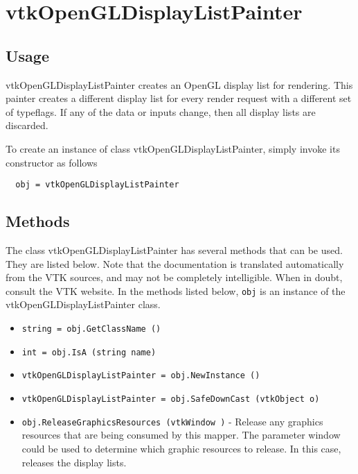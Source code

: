 \section{vtkOpenGLDisplayListPainter}

\subsection{Usage}

 vtkOpenGLDisplayListPainter creates an OpenGL display list for rendering.
 This painter creates a different display list for every render request with a
 different set of typeflags. If any of the data or inputs change, then all
 display lists are discarded.

To create an instance of class vtkOpenGLDisplayListPainter, simply
invoke its constructor as follows
\begin{verbatim}
  obj = vtkOpenGLDisplayListPainter
\end{verbatim}
\subsection{Methods}

The class vtkOpenGLDisplayListPainter has several methods that can be used.
  They are listed below.
Note that the documentation is translated automatically from the VTK sources,
and may not be completely intelligible.  When in doubt, consult the VTK website.
In the methods listed below, \verb|obj| is an instance of the vtkOpenGLDisplayListPainter class.
\begin{itemize}
\item  \verb|string = obj.GetClassName ()|

\item  \verb|int = obj.IsA (string name)|

\item  \verb|vtkOpenGLDisplayListPainter = obj.NewInstance ()|

\item  \verb|vtkOpenGLDisplayListPainter = obj.SafeDownCast (vtkObject o)|

\item  \verb|obj.ReleaseGraphicsResources (vtkWindow )| -  Release any graphics resources that are being consumed by this mapper.
 The parameter window could be used to determine which graphic
 resources to release. In this case, releases the display lists.

\end{itemize}
